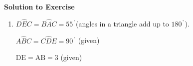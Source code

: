 \begin{table}[H]
{\begin{mdframed}[linewidth=4, leftmargin=40, rightmargin=40]
\begin{exercise}
\begin{figure}[H]
\begin{center}
      \vspace{2pt}
    \vspace{.1in}
    
    \end{center}

 \end{figure}   

    \addtocounter{footnote}{-0}
    
  \par 
\vspace{5pt}

\label{m38380*eip-477}\noindent\textbf{Solution to Exercise }
  \label{m38380*eip-156}\begin{enumerate}[noitemsep, label=\textbf{Step} \textbf{\arabic*}. ] 
            \leftskip=20pt\rightskip=\leftskip\item \label{m38380*id65234}\begin{math}D\hat{E}C=B\hat{A}C={55}^{\ensuremath{{\,}^{\circ}}}\end{math}\hspace{1ex}(angles in a triangle add up to 
\begin{math}{180}^{\ensuremath{{\,}^{\circ}}}\end{math}).\par 
      \label{m38380*id1166232344812}\begin{math}A\hat{B}C=C\hat{D}E={90}^{\ensuremath{{\,}^{\circ}}}\end{math}\hspace{1ex} (given)\par 
      \label{m38380*id1166233687055}\begin{math}\text{DE}=\text{AB}=3\end{math}\hspace{1ex} (given)\par 
      \label{m38380*id1166230595268}\nopagebreak\noindent{}
\end{enumerate}
\end{exercise}
\end{mdframed}}
\end{table}

